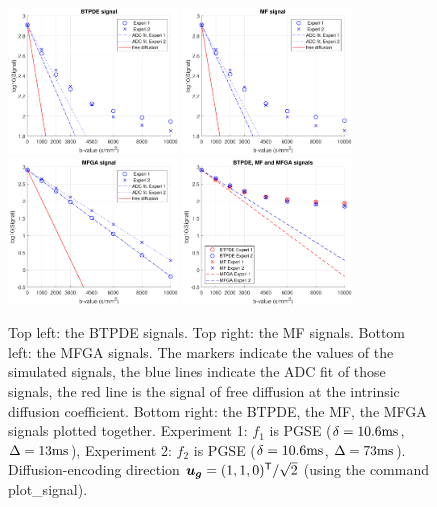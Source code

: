 \documentclass[a4paper]{article}
\begin{document}
\begin{figure}
    \centering
    \includegraphics[width=0.4\textwidth]{paper/btpde}
    \includegraphics[width=0.4\textwidth]{paper/mf} \\
    \vspace{0.4cm}
    \includegraphics[width=0.4\textwidth]{paper/mfga}
    \includegraphics[width=0.4\textwidth]{paper/btpde_mf_mfga}
    \caption{Top left: the BTPDE signals. Top right: the MF signals. Bottom left: the MFGA signals. The markers indicate the values of the simulated signals, the blue lines indicate the ADC fit of those signals, the red line is the signal of free diffusion at the intrinsic diffusion coefficient. Bottom right: the BTPDE, the MF, the MFGA signals plotted together. Experiment 1: $f_1$ is PGSE ($\delta = 10.6\mathrm{ms}$, $\Delta=13\mathrm{ms}$), Experiment 2: $f_2$ is PGSE ($\delta=10.6\mathrm{ms}$, $\Delta=73\mathrm{ms}$). Diffusion-encoding direction $\bm{u}_{\bm{g}} = (1,1,0)^{\mathsf{T}} / \sqrt{2}$ (using the command plot\_signal).}
    \label{fig:signal_mf}
\end{figure}
\end{document}
